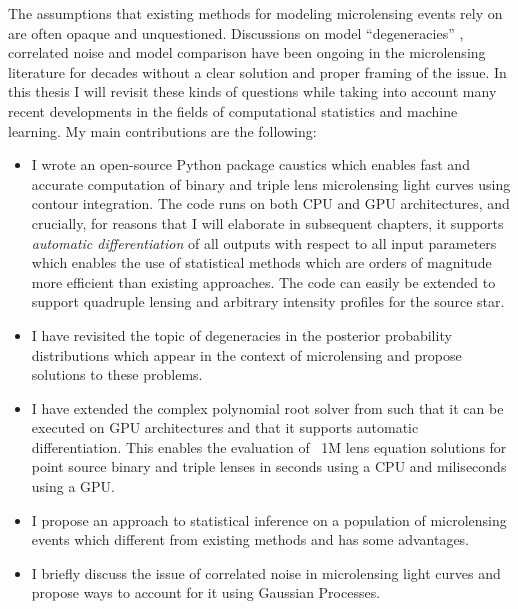 \documentclass[11pt]{report}
\begin{document}
The assumptions that existing methods for modeling microlensing events rely on
are often opaque and unquestioned. Discussions on model ``degeneracies''
\citep{2014MNRAS.437.4006S,2019AJ....157...23H,2018AcA....68...43S,2009MNRAS.393..816D},
correlated noise \citep{2015ApJ...812..136B,2019MNRAS.488.3308L} and model
comparison \citep{2018AJ....155..259H,2019MNRAS.484.5608D} have been ongoing in
the microlensing literature for decades without a clear solution and proper
framing of the issue. In this thesis I will revisit these kinds of questions
while taking into account many recent developments in the fields of
computational statistics and machine learning. My main contributions are the
following:
\begin{itemize}
    \item I wrote an open-source Python package \textsf{caustics} which enables fast and
          accurate computation of binary and triple lens microlensing light curves using
          contour integration. The code runs on both CPU and GPU architectures, and
          crucially, for reasons that I will elaborate in subsequent chapters, it
          supports \emph{automatic differentiation} of all outputs with respect to all
          input parameters which enables the use of statistical methods which are orders
          of magnitude more efficient than existing approaches. The code can easily be
          extended to support quadruple lensing and arbitrary intensity profiles for the
          source star.
    \item I have revisited the topic of degeneracies in the posterior probability
          distributions which appear in the context of microlensing and propose solutions
          to these problems.
    \item I have extended the complex polynomial root solver from \citet{Cameron2021}
          such that it can be executed on GPU architectures and that it supports
          automatic differentiation. This enables the evaluation of ~1M lens equation
          solutions for point source binary and triple lenses in seconds using a CPU and
          miliseconds using a GPU.
    \item I propose an approach to statistical inference on a population of microlensing
          events which different from existing methods and has some advantages.
    \item I briefly discuss the issue of correlated noise in microlensing light curves
          and propose ways to account for it using Gaussian Processes.
\end{itemize}
\end{document}

